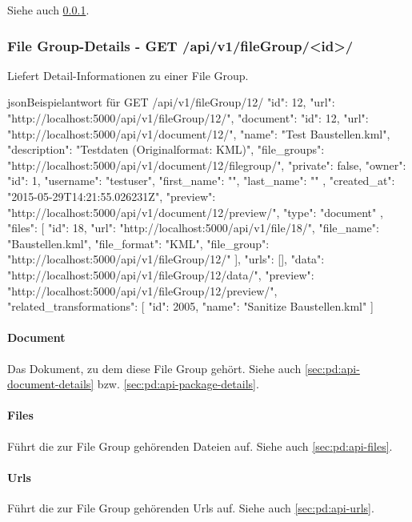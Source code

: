 Siehe auch \cref{sec:pd:api-filegroup-detail}.

\subsubsection{File Group-Details - GET /api/v1/fileGroup/<id>/} \label{sec:pd:api-filegroup-detail}
Liefert Detail-Informationen zu einer File Group.

\begin{srclst}{json}{Beispielantwort für GET /api/v1/fileGroup/12/}
{
      "id": 12, 
      "url": "http://localhost:5000/api/v1/fileGroup/12/", 
      "document": {
          "id": 12, 
          "url": "http://localhost:5000/api/v1/document/12/", 
          "name": "Test Baustellen.kml", 
          "description": "Testdaten (Originalformat: KML)", 
          "file_groups": "http://localhost:5000/api/v1/document/12/filegroup/", 
          "private": false, 
          "owner": {
              "id": 1, 
              "username": "testuser", 
              "first_name": "", 
              "last_name": ""
          }, 
          "created_at": "2015-05-29T14:21:55.026231Z", 
          "preview": "http://localhost:5000/api/v1/document/12/preview/", 
          "type": "document"
      }, 
      "files": [
          {
              "id": 18, 
              "url": "http://localhost:5000/api/v1/file/18/", 
              "file_name": "Baustellen.kml", 
              "file_format": "KML", 
              "file_group": "http://localhost:5000/api/v1/fileGroup/12/"
          }
      ], 
      "urls": [], 
      "data": "http://localhost:5000/api/v1/fileGroup/12/data/", 
      "preview": "http://localhost:5000/api/v1/fileGroup/12/preview/", 
      "related_transformations": [
          {
              "id": 2005, 
              "name": "Sanitize Baustellen.kml"
          }
      ]
  }
\end{srclst}

\paragraph{Document} Das Dokument, zu dem diese File Group gehört. Siehe auch \cref{sec:pd:api-document-details} bzw. \cref{sec:pd:api-package-details}.
\paragraph{Files} Führt die zur File Group gehörenden Dateien auf. Siehe auch \cref{sec:pd:api-files}.
\paragraph{Urls} Führt die zur File Group gehörenden Urls auf. Siehe auch \cref{sec:pd:api-urls}.
